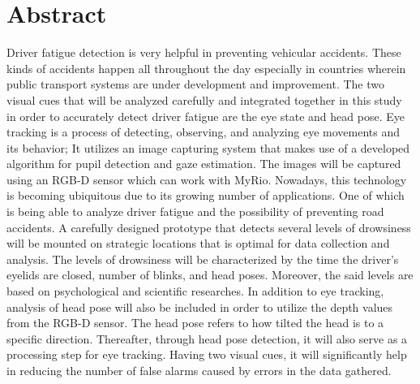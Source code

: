 \chapter*{Abstract}

\begin{comment}
Keep your abstract short by giving the gist/nutshell of your \MakeTextLowercase{\documentType}.	 Use the following checklist questions to help you in crafting your abstract.	

\begin{itemize}
	\item[$\square$] Did you briefly state what you intend to do?  
	\item[$\square$] Did you concisely discuss the problem statement?
	\item[$\square$] Did you tersely mention the objectives in general terms? 
	\item[$\square$] Did you succinctly describe the methodology for the target audience?
	\item[$\square$] Did you strongly describe your significant results and your conclusions?
\end{itemize}
\end{comment}
 Driver fatigue detection is very helpful in preventing vehicular accidents. These kinds of accidents happen all throughout the day especially in countries wherein public transport systems are under development and improvement. The two visual cues that will be analyzed carefully and integrated together in this study in order to accurately detect driver fatigue are the eye state and head pose. Eye tracking is a process of detecting, observing, and analyzing eye movements and its behavior; It utilizes an image capturing system that makes use of a developed algorithm for pupil detection and gaze estimation.  The images will be captured using an RGB-D sensor which can work with MyRio. Nowadays, this technology is becoming ubiquitous due to its growing number of applications. One of which is being able to analyze driver fatigue and the possibility of preventing road accidents. A carefully designed prototype that detects several levels of drowsiness will be mounted on strategic locations that is optimal for data collection and analysis. The levels of drowsiness will be characterized by the time the driver’s eyelids are closed, number of blinks, and head poses. Moreover, the said levels are based on psychological and scientific researches. In addition to eye tracking, analysis of head pose will also be included in order to utilize the depth values from the RGB-D sensor. The head pose refers to how tilted the head is to a specific direction. Thereafter, through head pose detection, it will also serve as a processing step for eye tracking. Having two visual cues, it will significantly help in reducing the number of false alarms caused by errors in the data gathered.



